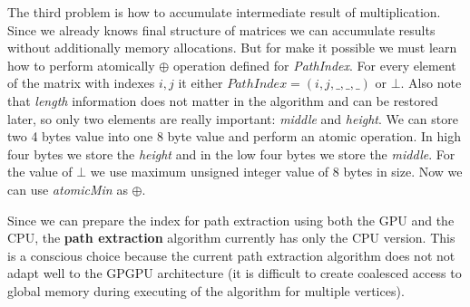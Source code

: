 The third problem is how to accumulate intermediate result of multiplication. Since we already knows final structure of matrices we can accumulate results without additionally memory allocations. But for make it possible we must learn how to perform atomically $\oplus$ operation defined for \textit{PathIndex}. For every element of the matrix with indexes $i,j$ it either $PathIndex = (i,j,\_,\_,\_)$ or $\bot$. Also note that \textit{length} information does not matter in the algorithm and can be restored later, so only two elements are really important: \textit{middle} and \textit{height}. We can store two 4 bytes value into one 8 byte value and perform an atomic operation. In high four bytes we store the \textit{height} and in the low four bytes we store the \textit{middle}. For the value of $\bot$ we use maximum unsigned integer value of 8 bytes in size. Now we can use \textit{atomicMin} as $\oplus$.

Since we can prepare the index for path extraction using both the GPU and the CPU, the \textbf{path extraction} algorithm currently has only the CPU version. This is a conscious choice because the current path extraction algorithm does not not adapt well to the GPGPU architecture (it is difficult to create coalesced access to global memory during executing of the algorithm for multiple vertices).
